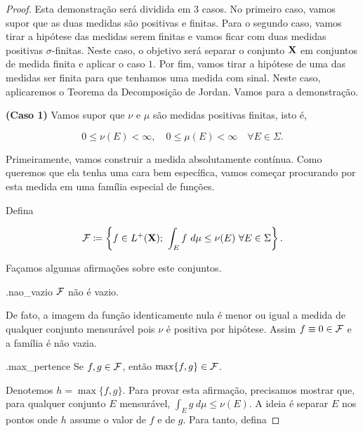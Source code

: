 \begin{proof}
    Esta demonstração será dividida em $3$ casos. No primeiro caso, vamos supor que as duas medidas são positivas e finitas. Para o segundo caso, vamos tirar a hipótese das medidas serem finitas e vamos ficar com duas medidas positivas $\sigma$-finitas. Neste caso, o objetivo será separar o conjunto $\mathbf{X}$ em conjuntos de medida finita e aplicar o caso $1$. Por fim, vamos tirar a hipótese de uma das medidas ser finita para que tenhamos uma medida com sinal. Neste caso, aplicaremos o Teorema da Decomposição de Jordan. Vamos para a demonstração.

    \textbf{(Caso 1)} Vamos supor que $\nu$ e $\mu$ são medidas positivas finitas, isto é,
    
    \begin{equation*}
        0 \leq \nu(E) < \infty, \quad 0 \leq \mu(E) < \infty \quad \forall E\in\Sigma.
    \end{equation*}

    Primeiramente, vamos construir a medida absolutamente contínua. Como queremos que ela tenha uma cara bem específica, vamos começar procurando por esta medida em uma família especial de funções.

    Defina

    \begin{equation*}
        \F \coloneq \left\{ f\in L^{+}(\X); \ \int_E f \ d\mu \leq \nu(E) \ \forall E\in\Sigma \right\}.
    \end{equation*}

    Façamos algumas afirmações sobre este conjuntos.

    \begin{claim}{.}{nao_vazio}
       $\mathcal{F}$ não é vazio.
    \end{claim}

    De fato, a imagem da função identicamente nula é menor ou igual a medida de qualquer conjunto mensurável pois $\nu$ é positiva por hipótese. Assim $f\equiv 0 \in \mathcal{F}$ e a família é não vazia.

    \begin{claim}{.}{max_pertence}
        Se $f,g \in \mathcal{F}$, então $\max \{f,g\} \in \mathcal{F}$.
    \end{claim}

    Denotemos $h=\max \{f,g\}$. Para provar esta afirmação, precisamos mostrar que, para qualquer conjunto $E$ mensurável, $\int_E g \  d\mu \leq \nu(E)$. A ideia é separar $E$ nos pontos onde $h$ assume o valor de $f$ e de $g$. Para tanto, defina


\end{proof}
